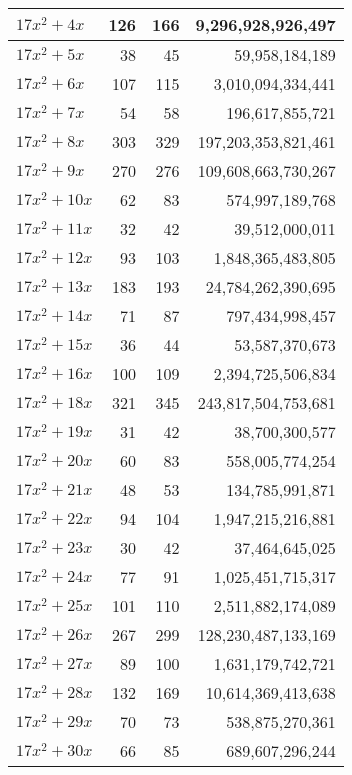 \documentclass[a4paper]{amsproc}
\theoremstyle{plain}
\begin{document}
\begin{longtable}{ | l | r | r | r | }
$17x^2 + 4x$ & 126 & 166 & 9{,}296{,}928{,}926{,}497 \\ \hline
$17x^2 + 5x$ & 38 & 45 & 59{,}958{,}184{,}189 \\ \hline
$17x^2 + 6x$ & 107 & 115 & 3{,}010{,}094{,}334{,}441 \\ \hline
$17x^2 + 7x$ & 54 & 58 & 196{,}617{,}855{,}721 \\ \hline
$17x^2 + 8x$ & 303 & 329 & 197{,}203{,}353{,}821{,}461 \\ \hline
$17x^2 + 9x$ & 270 & 276 & 109{,}608{,}663{,}730{,}267 \\ \hline
$17x^2 + 10x$ & 62 & 83 & 574{,}997{,}189{,}768 \\ \hline
$17x^2 + 11x$ & 32 & 42 & 39{,}512{,}000{,}011 \\ \hline
$17x^2 + 12x$ & 93 & 103 & 1{,}848{,}365{,}483{,}805 \\ \hline
$17x^2 + 13x$ & 183 & 193 & 24{,}784{,}262{,}390{,}695 \\ \hline
$17x^2 + 14x$ & 71 & 87 & 797{,}434{,}998{,}457 \\ \hline
$17x^2 + 15x$ & 36 & 44 & 53{,}587{,}370{,}673 \\ \hline
$17x^2 + 16x$ & 100 & 109 & 2{,}394{,}725{,}506{,}834 \\ \hline
$17x^2 + 18x$ & 321 & 345 & 243{,}817{,}504{,}753{,}681 \\ \hline
$17x^2 + 19x$ & 31 & 42 & 38{,}700{,}300{,}577 \\ \hline
$17x^2 + 20x$ & 60 & 83 & 558{,}005{,}774{,}254 \\ \hline
$17x^2 + 21x$ & 48 & 53 & 134{,}785{,}991{,}871 \\ \hline
$17x^2 + 22x$ & 94 & 104 & 1{,}947{,}215{,}216{,}881 \\ \hline
$17x^2 + 23x$ & 30 & 42 & 37{,}464{,}645{,}025 \\ \hline
$17x^2 + 24x$ & 77 & 91 & 1{,}025{,}451{,}715{,}317 \\ \hline
$17x^2 + 25x$ & 101 & 110 & 2{,}511{,}882{,}174{,}089 \\ \hline
$17x^2 + 26x$ & 267 & 299 & 128{,}230{,}487{,}133{,}169 \\ \hline
$17x^2 + 27x$ & 89 & 100 & 1{,}631{,}179{,}742{,}721 \\ \hline
$17x^2 + 28x$ & 132 & 169 & 10{,}614{,}369{,}413{,}638 \\ \hline
$17x^2 + 29x$ & 70 & 73 & 538{,}875{,}270{,}361 \\ \hline
$17x^2 + 30x$ & 66 & 85 & 689{,}607{,}296{,}244 \\ \hline

\end{longtable}
\end{document}
